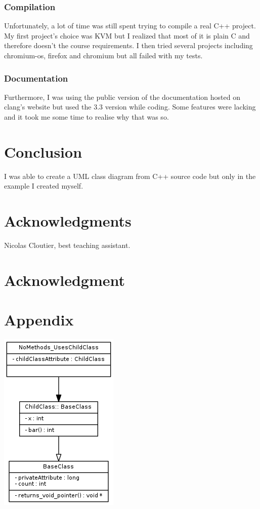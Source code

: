 \documentclass[conference,compsoc]{IEEEtran}
\begin{document}
\subsubsection{Compilation}
Unfortunately, a lot of time was still spent trying to compile a real C++ project.
 My first project's choice was KVM but I realized that most of it is plain C and
 therefore doesn't the course requirements. I then tried several projects including
 chromium-os, firefox and chromium but all failed with my tests.

\subsubsection{Documentation}

Furthermore, I was using the public version of the documentation hosted on clang's
 website but used the 3.3 version while coding. Some features were lacking and
 it took me some time to realise why that was so.

\section{Conclusion}

I was able to create a UML class diagram from C++ source code but only in
 the example I created myself.



\ifCLASSOPTIONcompsoc
  \section*{Acknowledgments}
    Nicolas Cloutier, best teaching assistant.
\else
  \section*{Acknowledgment}
\fi

\section{Appendix}

\includegraphics{graph}
\end{document}

